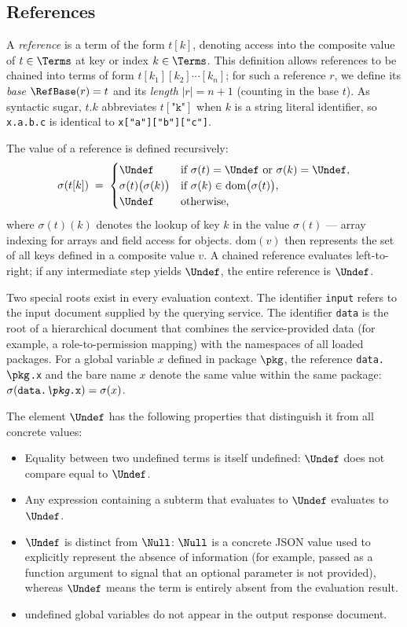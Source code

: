 
\subsection{References}
\label{ss:ref}


A \emph{reference} is a term of the form $t[k]$, denoting access into the composite value of $t \in \Terms$ at key or index $k \in \Terms$.
This definition allows references to be chained into terms of form $t[k_1][k_2]\cdots[k_n]$; for such a reference $r$, we define its \emph{base} $\RefBase(r) = t$ and its \emph{length} $|r| = n+1$ (counting in the base $t$).
As syntactic sugar, $t\texttt{.}k$ abbreviates $t[\texttt{"k"}]$ when $k$ is a string literal identifier, so \texttt{x.a.b.c} is identical to \texttt{x["a"]["b"]["c"]}.

The value of a reference is defined recursively:
\[
\sigma(t[k]) \;=\;
\begin{cases}
  \Undef & \text{if } \sigma(t) = \Undef \text{ or } \sigma(k) = \Undef, \\
  \sigma(t)\bigl(\sigma(k)\bigr) & \text{if } \sigma(k) \in \mathrm{dom}\bigl(\sigma(t)\bigr), \\
  \Undef & \text{otherwise,}
\end{cases}
\]
where $\sigma(t)(k)$ denotes the lookup of key $k$ in the value $\sigma(t)$ — array indexing for arrays and field access for objects.
$\mathrm{dom}(v)$ then represents the set of all keys defined in a composite value $v$.
A chained reference evaluates left-to-right; if any intermediate step yields $\Undef$, the entire reference is $\Undef$.

Two special roots exist in every evaluation context.
The identifier \texttt{input} refers to the input document supplied by the querying service.
The identifier \texttt{data} is the root of a hierarchical document that combines the service-provided data (for example, a role-to-permission mapping) with the namespaces of all loaded \rego packages.
For a global variable $x$ defined in package $\pkg$, the reference \texttt{data.$\pkg$.x} and the bare name $x$ denote the same value within the same package: $\sigma(\texttt{data.\textit{$\pkg$}.x}) = \sigma(x)$.

The element $\Undef$ has the following properties that distinguish it from all concrete values:
\begin{itemize}
  \item Equality between two undefined terms is itself undefined: $\Undef$ does not compare equal to $\Undef$.
  \item Any expression containing a subterm that evaluates to $\Undef$ evaluates to $\Undef$.
  \item $\Undef$ is distinct from $\Null$: $\Null$ is a concrete JSON value used to explicitly represent the absence of information (for example, passed as a function argument to signal that an optional parameter is not provided), whereas $\Undef$ means the term is entirely absent from the evaluation result.
  \item undefined global variables do not appear in the output response document.
\end{itemize}

